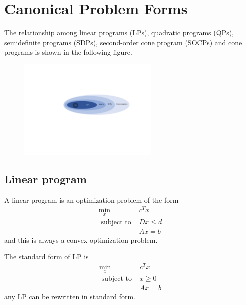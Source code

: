 \documentclass[a4paper]{article}
\begin{document}
{\section{Canonical Problem Forms}
The relationship among linear programs (LPs), quadratic programs (QPs), semidefinite programs (SDPs), second-order cone program (SOCPs) and cone programs is shown in the following figure.
\begin{figure}[htbp] 
  \centering 
  \includegraphics[width=0.6\textwidth]{img/LPs_relationship.pdf} 
\end{figure}

\subsection{Linear program}
\begin{defi}
  A linear program is an optimization problem of the form
  \[
  \begin{array}{ll}
      \min\limits_{x} & c^T x  \\
      \text { subject to } & Dx \leq d \\ \nonumber
      & Ax = b
  \end{array} 
  \]
  and this is always a convex optimization problem.
\end{defi}

The standard form of LP is 
\begin{equation}
  \begin{array}{ll}
    \min\limits_{x} & c^T x  \\
    \text { subject to } & x \geq 0 \\ \nonumber
    & Ax = b
\end{array} 
\end{equation}
any LP can be rewritten in standard form.

}
\end{document}
